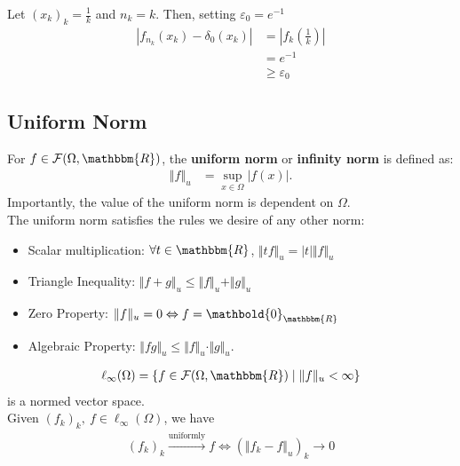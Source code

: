 \documentclass[10pt]{extarticle}
\renewcommand{\mathbf}[1]{\mathbold{#1}}
\newcommand{\R}{\mathbbm{R}}
\begin{document}
    Let $(x_k)_k = \frac{1}{k}$ and $n_k = k$. Then, setting $\varepsilon_0 = e^{-1}$
    \begin{align*}
      \left|f_{n_k}(x_k) - \delta_0(x_k)\right| &= \left|f_k\left(\frac{1}{k}\right)\right|\\
                                                &= e^{-1}\\
                                                &\geq \varepsilon_0
    \end{align*}
  \subsection{Uniform Norm}%
    For $f\in \mathcal{F}(\Omega,\R)$, the \textbf{uniform norm} or \textbf{infinity norm} is defined as:
    \begin{align*}
      \left\Vert f \right\Vert_{u} &= \sup_{x\in\Omega}\left|f(x)\right|.
    \end{align*}
    Importantly, the value of the uniform norm is dependent on $\Omega$.\\

    The uniform norm satisfies the rules we desire of any other norm:
    \begin{itemize}
      \item Scalar multiplication: $\forall t\in\R$, $\Vert tf\Vert_u = |t|\Vert f \Vert_u$
      \item Triangle Inequality: $\Vert f + g \Vert_u \leq \Vert f \Vert_u + \Vert g \Vert_u$
      \item Zero Property: $\Vert f\Vert_u = 0 \Leftrightarrow f = \mathbf{0}_{\R}$
      \item Algebraic Property: $\Vert fg\Vert_u \leq \Vert f\Vert_u \cdot \Vert g \Vert_u$.
    \end{itemize}

    \begin{align*}
      \ell_{\infty}(\Omega) = \left\{f\in\mathcal{F}(\Omega,\R)\mid \Vert f \Vert_u < \infty\right\}
    \end{align*}
    is a normed vector space.\\
    
    Given $(f_k)_k,~f \in \ell_{\infty}(\Omega)$, we have
    \begin{align*}
      (f_k)_k \xrightarrow{\text{uniformly}} f \Leftrightarrow \left(\Vert f_k - f \Vert_u\right)_k \rightarrow 0
    \end{align*}
\end{document}
